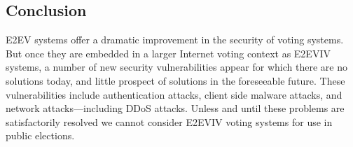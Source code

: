 \subsection{Conclusion}

E2EV systems offer a dramatic improvement in the security of voting
systems. But once they are embedded in a larger Internet voting
context as E2EVIV systems, a number of new security vulnerabilities
appear for which there are no solutions today, and little prospect of
solutions in the foreseeable future.  These vulnerabilities include
authentication attacks, client side malware attacks, and network
attacks---including DDoS attacks.  Unless and until these problems are
satisfactorily resolved we cannot consider E2EVIV voting systems for
use in public elections.

